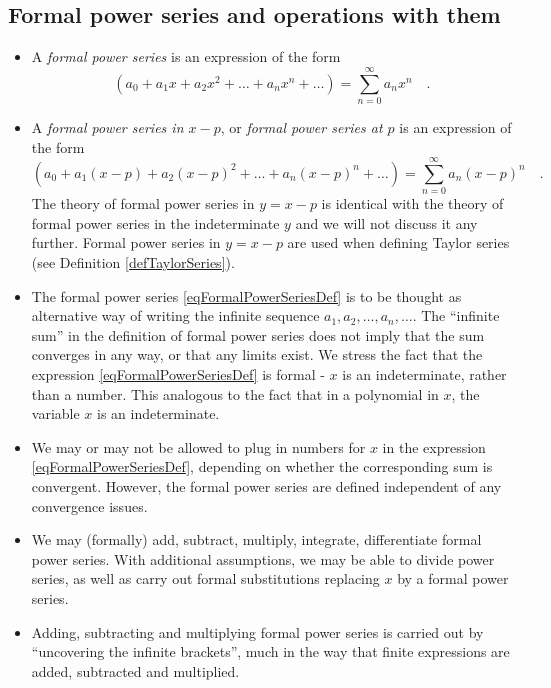 \documentclass[12pt]{book}
\begin{document}
\subsection{Formal power series and operations with them}\label{secFormalPowerSeries}
\begin{itemize}
\item {} A \emph{formal power series} is an expression of the form 
\begin{equation}\label{eqFormalPowerSeriesDef}
(a_0 + a_1x+a_2x^2+\dots +a_nx^n+\dots)= \sum_{n=0}^{\infty} a_n x^n \quad .
\end{equation}
\item {} A \emph{formal power series in $x-p$}, or \emph{formal power series at $p$} is an expression of the form 
\begin{equation}\label{eqFormalPowerAtPSeriesDef}
(a_0 + a_1(x-p)+a_2(x-p)^2+\dots +a_n(x-p)^n+\dots)= \sum_{n=0}^{\infty} a_n (x-p)^n \quad .
\end{equation}
The theory of formal power series in $y=x-p$ is identical with the theory of formal power series in the indeterminate $y$ and we will not discuss it any further. Formal power series in $y=x-p$ are used when defining Taylor series (see Definition \ref{defTaylorSeries}).
\item The formal power series \eqref{eqFormalPowerSeriesDef} is to be thought as alternative way of writing the infinite sequence $a_1, a_2, \dots, a_n,\dots $. The ``infinite sum'' in the definition of formal power series does not imply that the sum converges in any way, or that any limits exist. We stress the fact that the expression  \eqref{eqFormalPowerSeriesDef} is  formal - $x$  is an indeterminate, rather than a number. This analogous to the fact that in a polynomial in $x$, the variable $x$ is an indeterminate.
\item We may or may not be allowed to plug in numbers for $x$ in the expression \eqref{eqFormalPowerSeriesDef}, depending on whether the corresponding sum is convergent. However, the formal power series are defined independent of any convergence issues.
\item We may (formally) add, subtract, multiply, integrate, differentiate formal power series. With additional assumptions, we may be able to divide power series, as well as carry out formal substitutions replacing $x$ by a formal power series. 
\item Adding, subtracting and multiplying formal power series is carried out by ``uncovering the infinite brackets'', much in the way that finite expressions are added, subtracted and multiplied.

\end{itemize}
\end{document}
